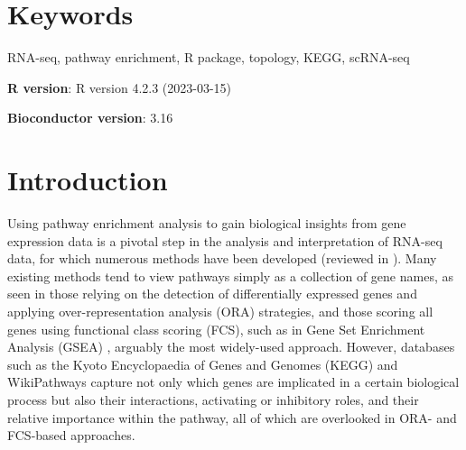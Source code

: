 \documentclass[9pt,a4paper,]{extarticle}
\begin{document}
\section*{Keywords}
RNA-seq, pathway enrichment, R package, topology, KEGG, scRNA-seq


\clearpage
\pagestyle{main}

\textbf{R version}: R version 4.2.3 (2023-03-15)

\textbf{Bioconductor version}: 3.16

\hypertarget{introduction}{%
\section{Introduction}\label{introduction}}

Using pathway enrichment analysis to gain biological insights from gene expression data is a pivotal step in the analysis and interpretation of RNA-seq data, for which numerous methods have been developed (reviewed in \citep{Maleki2020-ur, Mubeen2022-eq}).
Many existing methods tend to view pathways simply as a collection of gene names, as seen in those relying on the detection of differentially expressed genes and applying over-representation analysis (ORA) strategies, and those scoring all genes using functional class scoring (FCS), such as in Gene Set Enrichment Analysis (GSEA) \citep{Subramanian2005-lx}, arguably the most widely-used approach.
However, databases such as the Kyoto Encyclopaedia of Genes and Genomes (KEGG)\citep{OgataKEGGKyotoEncyclopediaa} and WikiPathways\citep{Martens2021} capture not only which genes are implicated in a certain biological process but also their interactions, activating or inhibitory roles, and their relative importance within the pathway, all of which are overlooked in ORA- and FCS-based approaches.
\end{document}
